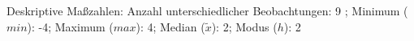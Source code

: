 				\label{tableValues:cski02a}
				\vspace*{-\baselineskip}
                    \begin{noten}
                	    \note{} Deskriptive Maßzahlen:
                	    Anzahl unterschiedlicher Beobachtungen: 9%
                	    ; 
                	      Minimum ($min$): -4; 
                	      Maximum ($max$): 4; 
                	      Median ($\tilde{x}$): 2; 
                	      Modus ($h$): 2
                     \end{noten}

